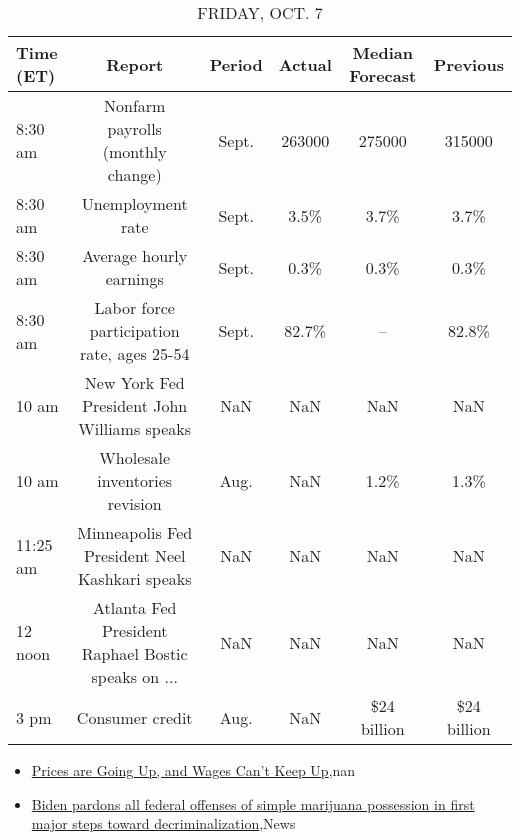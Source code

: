\documentclass{article}%
\begin{document}
\begin{table}[htbp]%
\caption{FRIDAY, OCT. 7}%
\centering%
\begin{adjustbox}{width=1\textwidth}%
\begin{tabular}{lccccc}
\toprule
Time (ET) &                                             Report & Period & Actual & Median Forecast &    Previous \\
\midrule
  8:30 am &                  Nonfarm payrolls (monthly change) &  Sept. & 263000 &          275000 &      315000 \\
  8:30 am &                                  Unemployment rate &  Sept. &   3.5\% &            3.7\% &        3.7\% \\
  8:30 am &                            Average hourly earnings &  Sept. &   0.3\% &            0.3\% &        0.3\% \\
  8:30 am &         Labor force participation rate, ages 25-54 &  Sept. &  82.7\% &              -- &       82.8\% \\
    10 am &        New York Fed President John Williams speaks &    NaN &    NaN &             NaN &         NaN \\
    10 am &                     Wholesale inventories revision &   Aug. &    NaN &            1.2\% &        1.3\% \\
 11:25 am &     Minneapolis Fed President Neel Kashkari speaks &    NaN &    NaN &             NaN &         NaN \\
  12 noon & Atlanta Fed President Raphael Bostic speaks on ... &    NaN &    NaN &             NaN &         NaN \\
     3 pm &                                    Consumer credit &   Aug. &    NaN &     \$24 billion & \$24 billion \\
\bottomrule
\end{tabular}
%
\end{adjustbox}%
\end{table}

%
\begin{itemize}%
\item%
\href{https://reddit.com/r/Economics/comments/xxvrv2/prices\_are\_going\_up\_and\_wages\_cant\_keep\_up/}{Prices are Going Up, and Wages Can't Keep Up},nan%
\item%
\href{https://reddit.com/r/Economics/comments/xxvc4p/biden\_pardons\_all\_federal\_offenses\_of\_simple/}{Biden pardons all federal offenses of simple marijuana possession in first major steps toward decriminalization},News%
\end{itemize}%
\end{document}
